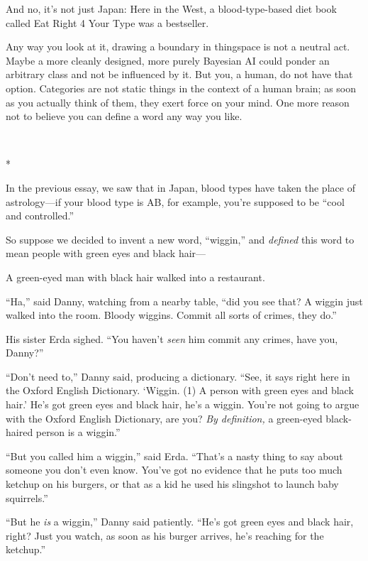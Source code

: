 {
 And no, it's not just Japan: Here in the West, a
blood-type-based diet book called Eat Right 4 Your Type was a
bestseller.}

{
 Any way you look at it, drawing a boundary in thingspace is not a
neutral act. Maybe a more cleanly designed, more purely Bayesian AI
could ponder an arbitrary class and not be influenced by it. But you, a
human, do not have that option. Categories are not static things in the
context of a human brain; as soon as you actually think of them, they
exert force on your mind. One more reason not to believe you can define
a word any way you like.}

{\centering
 \ ~
\par}

{\centering
 *
\par}


{
 In the previous essay, we saw that in Japan, blood types have
taken the place of astrology---if your blood type is AB, for example,
you're supposed to be ``cool and
controlled.'' }

{
 So suppose we decided to invent a new word,
``wiggin,'' and \textit{defined}
this word to mean people with green eyes and black hair---}

{
 A green-eyed man with black hair walked into a restaurant.}

{
 ``Ha,'' said Danny, watching
from a nearby table, ``did you see that? A wiggin just
walked into the room. Bloody wiggins. Commit all sorts of crimes, they
do.''}

{
 His sister Erda sighed. ``You
haven't \textit{seen} him commit any crimes, have you,
Danny?''}

{
 ``Don't need
to,'' Danny said, producing a dictionary.
``See, it says right here in the Oxford English
Dictionary. `Wiggin. (1) A person with green eyes and
black hair.' He's got green eyes and
black hair, he's a wiggin. You're not
going to argue with the Oxford English Dictionary, are you? \textit{By
definition,} a green-eyed black-haired person is a
wiggin.''}

{
 ``But you called him a
wiggin,'' said Erda.
``That's a nasty thing to say about
someone you don't even know. You've got
no evidence that he puts too much ketchup on his burgers, or that as a
kid he used his slingshot to launch baby
squirrels.''}

{
 ``But he \textit{is} a
wiggin,'' Danny said patiently.
``He's got green eyes and black hair,
right? Just you watch, as soon as his burger arrives,
he's reaching for the ketchup.''}

